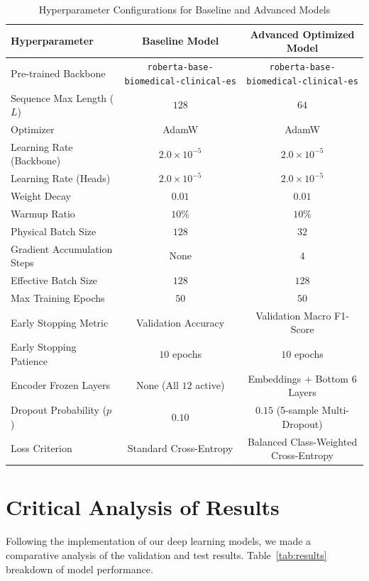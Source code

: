 \documentclass{article}
\begin{document}
\begin{table}[h]
\centering
\caption{Hyperparameter Configurations for Baseline and Advanced Models}
\label{tab:hyperparameters}
\begin{tabular}{lcc}
\toprule
\textbf{Hyperparameter} & \textbf{Baseline Model} & \textbf{Advanced Optimized Model} \\
\midrule
Pre-trained Backbone & \texttt{roberta-base-biomedical-clinical-es} & \texttt{roberta-base-biomedical-clinical-es} \\
Sequence Max Length ($L$) & $128$ & $64$ \\
Optimizer & AdamW & AdamW \\
Learning Rate (Backbone) & $2.0 \times 10^{-5}$ & $2.0 \times 10^{-5}$ \\
Learning Rate (Heads) & $2.0 \times 10^{-5}$ & $2.0 \times 10^{-5}$ \\
Weight Decay & $0.01$ & $0.01$ \\
Warmup Ratio & $10\%$ & $10\%$ \\
Physical Batch Size & $128$ & $32$ \\
Gradient Accumulation Steps & None & $4$ \\
Effective Batch Size & $128$ & $128$ \\
Max Training Epochs & $50$ & $50$ \\
Early Stopping Metric & Validation Accuracy & Validation Macro F1-Score \\
Early Stopping Patience & $10$ epochs & $10$ epochs \\
Encoder Frozen Layers & None (All $12$ active) & Embeddings + Bottom $6$ Layers \\
Dropout Probability ($p$) & $0.10$ & $0.15$ (5-sample Multi-Dropout) \\
Loss Criterion & Standard Cross-Entropy & Balanced Class-Weighted Cross-Entropy \\
\bottomrule
\end{tabular}
\end{table}

\vspace{\baselineskip}
\vspace{\baselineskip}

\section{Critical Analysis of Results}
Following the  implementation of our deep learning models, we made a comparative analysis of the validation and test results. Table~\ref{tab:results} breakdown of model performance.
\end{document}
